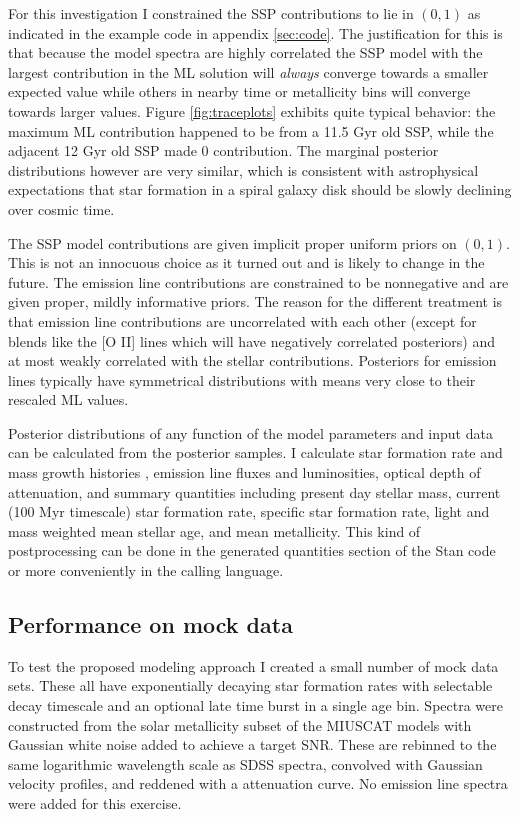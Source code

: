 \documentclass[modern]{aastex62}
\begin{document}
For this investigation I constrained the SSP contributions to lie in $(0, 1)$ as indicated in the example code in appendix \ref{sec:code}. The justification for this is that because the model spectra are highly correlated the SSP model with the largest contribution in the ML solution will \emph{always} converge towards a smaller expected value while others in nearby time or metallicity bins will converge towards larger values. Figure \ref{fig:traceplots} exhibits quite typical behavior: the maximum ML contribution happened to be from a 11.5 Gyr old SSP, while the adjacent 12 Gyr old SSP made 0 contribution. The marginal posterior distributions however are very similar, which is consistent with astrophysical expectations that star formation in a spiral galaxy disk should be slowly declining over cosmic time.

The SSP model contributions are given implicit proper uniform priors on $(0, 1)$. This is not an innocuous choice as it turned out and is likely to change in the future. The emission line contributions are constrained to be nonnegative and are given proper, mildly informative priors. The reason for the different treatment is that emission line contributions are uncorrelated with each other (except for blends like the [O II] lines which will have negatively correlated posteriors) and at most weakly correlated with the stellar contributions. Posteriors for emission lines typically have symmetrical distributions with means very close to their rescaled ML values.

Posterior distributions of any function of the model parameters and input data can be calculated from the posterior samples. I calculate star formation rate and mass growth histories \citep{2012ApJ...745..149L, 2015MNRAS.448.3484M, 2016MNRAS.463.2799I}, emission line fluxes and luminosities, optical depth of attenuation, and summary quantities including present day stellar mass, current (100 Myr timescale) star formation rate, specific star formation rate, light and mass weighted mean stellar age, and mean metallicity. This kind of postprocessing can be done in the generated quantities section of the Stan code or more conveniently in the calling language.

\subsection{Performance on mock data}
\label{sec:mocks}


To test the proposed modeling approach I created a small number of mock data sets. These all have exponentially decaying star formation rates with selectable decay timescale and an optional late time burst in a single age bin. Spectra were constructed from the solar metallicity subset of the MIUSCAT models with Gaussian white noise added to achieve a target SNR. These are rebinned to the same logarithmic wavelength scale as SDSS spectra, convolved with Gaussian velocity profiles, and reddened with a \citet{2001PASP..113.1449C} attenuation curve. No emission line spectra were added for this exercise.
\end{document}

